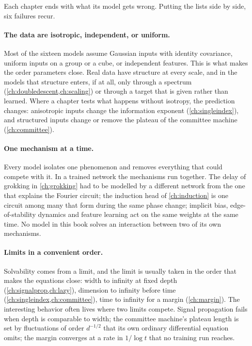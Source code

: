 \begin{refsection}

Each chapter ends with what its model gets wrong. Putting the lists side by side, six failures recur.

\paragraph{The data are isotropic, independent, or uniform.} Most of the sixteen models assume Gaussian inputs with identity covariance, uniform inputs on a group or a cube, or independent features. This is what makes the order parameters close. Real data have structure at every scale, and in the models that structure enters, if at all, only through a spectrum (\cref{ch:doubledescent,ch:scaling}) or through a target that is given rather than learned. Where a chapter tests what happens without isotropy, the prediction changes: anisotropic inputs change the information exponent (\cref{ch:singleindex}), and structured inputs change or remove the plateau of the committee machine (\cref{ch:committee}).

\paragraph{One mechanism at a time.} Every model isolates one phenomenon and removes everything that could compete with it. In a trained network the mechanisms run together. The delay of grokking in \cref{ch:grokking} had to be modelled by a different network from the one that explains the Fourier circuit; the induction head of \cref{ch:induction} is one circuit among many that form during the same phase change; implicit bias, edge-of-stability dynamics and feature learning act on the same weights at the same time. No model in this book solves an interaction between two of its own mechanisms.

\paragraph{Limits in a convenient order.} Solvability comes from a limit, and the limit is usually taken in the order that makes the equations close: width to infinity at fixed depth (\cref{ch:signalprop,ch:lazy}), dimension to infinity before time (\cref{ch:singleindex,ch:committee}), time to infinity for a margin (\cref{ch:margin}). The interesting behavior often lives where two limits compete. Signal propagation fails when depth is comparable to width; the committee machine's plateau length is set by fluctuations of order $d^{-1/2}$ that its own ordinary differential equation omits; the margin converges at a rate in $1/\log t$ that no training run reaches.


\end{refsection}
